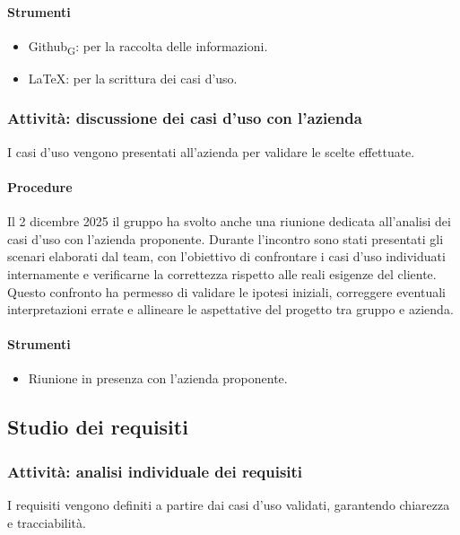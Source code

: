\documentclass[11pt,a4paper]{article}
\newcommand{\gls}[1]{#1\textsubscript{G}}
\begin{document}
\paragraph{Strumenti}
\begin{itemize}
\item \gls{Github}: per la raccolta delle informazioni.
\item LaTeX: per la scrittura dei casi d'uso.
\end{itemize}

\subsubsection{Attività: discussione dei casi d’uso con l’azienda}
I casi d’uso vengono presentati all’azienda per validare le scelte effettuate.

\paragraph{Procedure}
Il 2 dicembre 2025 il gruppo ha svolto anche una riunione dedicata all'analisi dei casi d'uso con l’azienda proponente. Durante l’incontro sono stati presentati gli scenari elaborati dal team, con l’obiettivo di confrontare i casi d’uso individuati internamente e verificarne la correttezza rispetto alle reali esigenze del cliente. Questo confronto ha permesso di validare le ipotesi iniziali, correggere eventuali interpretazioni errate e allineare le aspettative del progetto tra gruppo e azienda.

\paragraph{Strumenti}
\begin{itemize}
\item Riunione in presenza con l'azienda proponente.
\end{itemize}

\subsection{Studio dei requisiti}

\subsubsection{Attività: analisi individuale dei requisiti}
I requisiti vengono definiti a partire dai casi d’uso validati, garantendo chiarezza e tracciabilità.
\end{document}
